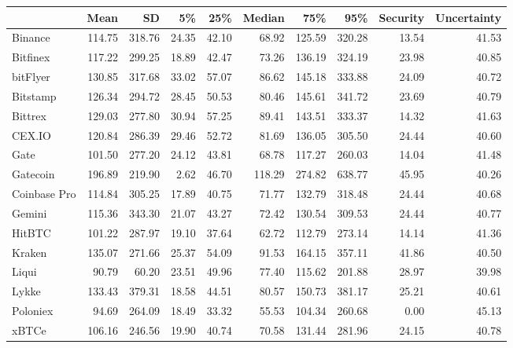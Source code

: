 \begin{tabular}{lrrrrrrrrr}
  \toprule
  & Mean & SD & 5\% & 25\% & Median & 75\% & 95\% & Security & Uncertainty \\ 
  \midrule
Binance & 114.75 & 318.76 & 24.35 & 42.10 & 68.92 & 125.59 & 320.28 & 13.54 & 41.53 \\ 
  Bitfinex & 117.22 & 299.25 & 18.89 & 42.47 & 73.26 & 136.19 & 324.19 & 23.98 & 40.85 \\ 
  bitFlyer & 130.85 & 317.68 & 33.02 & 57.07 & 86.62 & 145.18 & 333.88 & 24.09 & 40.72 \\ 
  Bitstamp & 126.34 & 294.72 & 28.45 & 50.53 & 80.46 & 145.61 & 341.72 & 23.69 & 40.79 \\ 
  Bittrex & 129.03 & 277.80 & 30.94 & 57.25 & 89.41 & 143.51 & 333.37 & 14.32 & 41.63 \\ 
  CEX.IO & 120.84 & 286.39 & 29.46 & 52.72 & 81.69 & 136.05 & 305.50 & 24.44 & 40.60 \\ 
  Gate & 101.50 & 277.20 & 24.12 & 43.81 & 68.78 & 117.27 & 260.03 & 14.04 & 41.48 \\ 
  Gatecoin & 196.89 & 219.90 & 2.62 & 46.70 & 118.29 & 274.82 & 638.77 & 45.95 & 40.26 \\ 
  Coinbase Pro & 114.84 & 305.25 & 17.89 & 40.75 & 71.77 & 132.79 & 318.48 & 24.44 & 40.68 \\ 
  Gemini & 115.36 & 343.30 & 21.07 & 43.27 & 72.42 & 130.54 & 309.53 & 24.44 & 40.77 \\ 
  HitBTC & 101.22 & 287.97 & 19.10 & 37.64 & 62.72 & 112.79 & 273.14 & 14.14 & 41.36 \\ 
  Kraken & 135.07 & 271.66 & 25.37 & 54.09 & 91.53 & 164.15 & 357.11 & 41.86 & 40.50 \\ 
  Liqui & 90.79 & 60.20 & 23.51 & 49.96 & 77.40 & 115.62 & 201.88 & 28.97 & 39.98 \\ 
  Lykke & 133.43 & 379.31 & 18.58 & 44.51 & 80.57 & 150.73 & 381.17 & 25.21 & 40.61 \\ 
  Poloniex & 94.69 & 264.09 & 18.49 & 33.32 & 55.53 & 104.34 & 260.68 & 0.00 & 45.13 \\ 
  xBTCe & 106.16 & 246.56 & 19.90 & 40.74 & 70.58 & 131.44 & 281.96 & 24.15 & 40.78 \\ 
   \bottomrule
\end{tabular}
